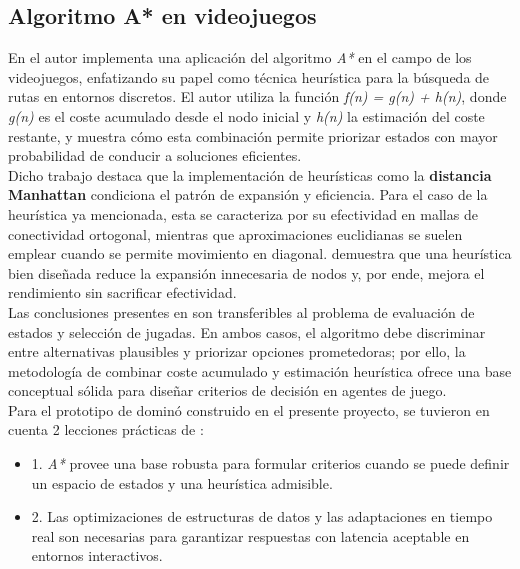 \documentclass[journal,onecolumn]{IEEEtran}
\begin{document}
\subsection{Algoritmo A* en videojuegos}
En \cite{liu2023research} el autor implementa una aplicación del algoritmo \textit{A*} en el campo de los videojuegos, enfatizando su papel como técnica heurística para la búsqueda de rutas en entornos discretos. El autor utiliza la función \textit{f(n) = g(n) + h(n)}, donde \textit{g(n)} es el coste acumulado desde el nodo inicial y \textit{h(n)} la estimación del coste restante, y muestra cómo esta combinación permite priorizar estados con mayor probabilidad de conducir a soluciones eficientes.\\
Dicho trabajo destaca que la implementación de heurísticas como la \textbf{distancia Manhattan} condiciona el patrón de expansión y eficiencia. Para el caso de la heurística ya mencionada, esta se caracteriza por su efectividad en mallas de conectividad ortogonal, mientras que aproximaciones euclidianas se suelen emplear cuando se permite movimiento en diagonal. \cite{liu2023research} demuestra que una heurística bien diseñada reduce la expansión innecesaria de nodos y, por ende, mejora el rendimiento sin sacrificar efectividad.\\
Las conclusiones presentes en \cite{liu2023research} son transferibles al problema de evaluación de estados y selección de jugadas. En ambos casos, el algoritmo debe discriminar entre alternativas plausibles y priorizar opciones prometedoras; por ello, la metodología de combinar coste acumulado y estimación heurística ofrece una base conceptual sólida para diseñar criterios de decisión en agentes de juego.\\
Para el prototipo de dominó construido en el presente proyecto, se tuvieron en cuenta 2 lecciones prácticas de \cite{liu2023research}:\\
\begin{itemize}
    \item 1. \textit{A*} provee una base robusta para formular criterios cuando se puede definir un espacio de estados y una heurística admisible.\\
    \item 2. Las optimizaciones de estructuras de datos y las adaptaciones en tiempo real son necesarias para garantizar respuestas con latencia aceptable en entornos interactivos.
\end{itemize}
\end{document}
